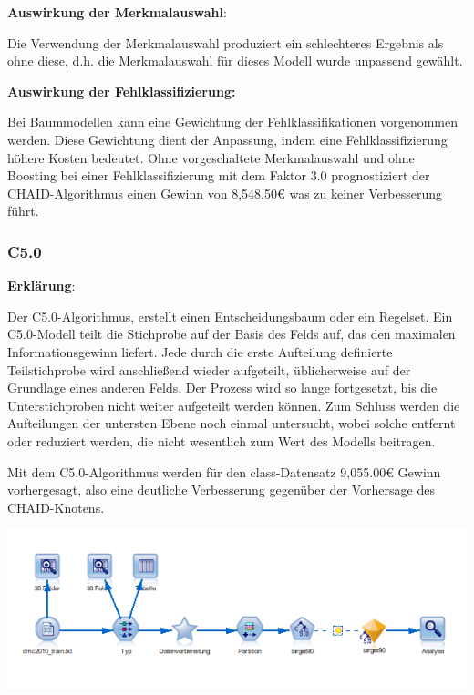 \documentclass[a4paper,12pt]{article}
\newcounter{Algorithmus}
\begin{document}
{\bf Auswirkung der Merkmalauswahl}:
\par
\vspace{0.2cm}
Die Verwendung der Merkmalauswahl produziert ein schlechteres Ergebnis als ohne diese, d.h. die Merkmalauswahl für dieses Modell wurde unpassend gewählt.
\par
\vspace{0.2cm}

{\bf Auswirkung der Fehlklassifizierung:}
\par
\vspace{0.2cm}
Bei Baummodellen kann eine Gewichtung der Fehlklassifikationen vorgenommen werden. Diese
Gewichtung dient der Anpassung, indem eine Fehlklassifizierung höhere
Kosten bedeutet. Ohne vorgeschaltete Merkmalauswahl und ohne Boosting bei einer Fehlklassifizierung mit dem Faktor 3.0 prognostiziert der CHAID-Algorithmus einen Gewinn von 8,548.50\;\euro\;
was zu keiner Verbesserung führt.

\subsubsection{C5.0}
{\bf Erklärung}:
\par
\vspace{0.2cm}
Der C5.0-Algorithmus, erstellt einen Entscheidungsbaum oder ein Regelset.
 Ein C5.0-Modell teilt die Stichprobe auf der Basis des Felds auf, das den maximalen
Informationsgewinn liefert. Jede durch die erste Aufteilung definierte Teilstichprobe wird anschließend
wieder aufgeteilt, üblicherweise auf der Grundlage eines anderen Felds. Der Prozess wird so lange fortgesetzt,
bis die Unterstichproben nicht weiter aufgeteilt werden können. Zum Schluss werden die Aufteilungen
der untersten Ebene noch einmal untersucht, wobei solche entfernt oder reduziert werden, die nicht
wesentlich zum Wert des Modells beitragen.
\par
\vspace{0.2cm}
Mit dem C5.0-Algorithmus werden für den class-Datensatz 9,055.00\;\euro\; Gewinn vorhergesagt, also eine deutliche Verbesserung gegenüber der Vorhersage des CHAID-Knotens.

\begin{center}
\includegraphics[width=\textwidth]{Screens/c50}
\end{center}
\end{document}
